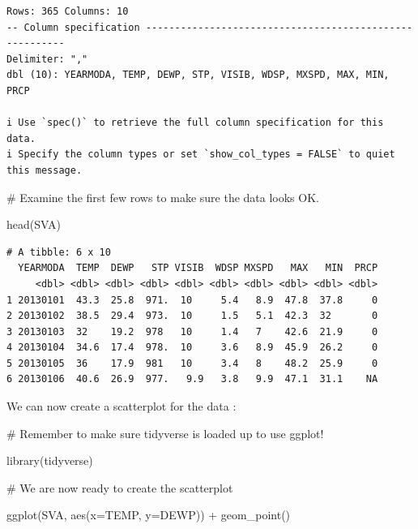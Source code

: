 \documentclass[
  letterpaper,
  DIV=11,
  numbers=noendperiod]{scrreprt}
\newenvironment{Shaded}{\begin{snugshade}}{\end{snugshade}}
\newcommand{\AttributeTok}[1]{\textcolor[rgb]{0.40,0.45,0.13}{#1}}
\newcommand{\CommentTok}[1]{\textcolor[rgb]{0.37,0.37,0.37}{#1}}
\newcommand{\FunctionTok}[1]{\textcolor[rgb]{0.28,0.35,0.67}{#1}}
\newcommand{\NormalTok}[1]{\textcolor[rgb]{0.00,0.23,0.31}{#1}}
\newcommand{\SpecialCharTok}[1]{\textcolor[rgb]{0.37,0.37,0.37}{#1}}
\begin{document}
\begin{verbatim}
Rows: 365 Columns: 10
-- Column specification --------------------------------------------------------
Delimiter: ","
dbl (10): YEARMODA, TEMP, DEWP, STP, VISIB, WDSP, MXSPD, MAX, MIN, PRCP

i Use `spec()` to retrieve the full column specification for this data.
i Specify the column types or set `show_col_types = FALSE` to quiet this message.
\end{verbatim}

\begin{Shaded}
\begin{Highlighting}[]
\CommentTok{\# Examine the first few rows to make sure the data looks OK.}

\FunctionTok{head}\NormalTok{(SVA)}
\end{Highlighting}
\end{Shaded}

\begin{verbatim}
# A tibble: 6 x 10
  YEARMODA  TEMP  DEWP   STP VISIB  WDSP MXSPD   MAX   MIN  PRCP
     <dbl> <dbl> <dbl> <dbl> <dbl> <dbl> <dbl> <dbl> <dbl> <dbl>
1 20130101  43.3  25.8  971.  10     5.4   8.9  47.8  37.8     0
2 20130102  38.5  29.4  973.  10     1.5   5.1  42.3  32       0
3 20130103  32    19.2  978   10     1.4   7    42.6  21.9     0
4 20130104  34.6  17.4  978.  10     3.6   8.9  45.9  26.2     0
5 20130105  36    17.9  981   10     3.4   8    48.2  25.9     0
6 20130106  40.6  26.9  977.   9.9   3.8   9.9  47.1  31.1    NA
\end{verbatim}

We can now create a scatterplot for the data :

\begin{Shaded}
\begin{Highlighting}[]
\CommentTok{\# Remember to make sure tidyverse is loaded up to use ggplot! }

\FunctionTok{library}\NormalTok{(tidyverse)}
\end{Highlighting}
\end{Shaded}

\begin{Shaded}
\begin{Highlighting}[]
\CommentTok{\# We are now ready to create the scatterplot}

\FunctionTok{ggplot}\NormalTok{(SVA, }\FunctionTok{aes}\NormalTok{(}\AttributeTok{x=}\NormalTok{TEMP, }\AttributeTok{y=}\NormalTok{DEWP)) }\SpecialCharTok{+}
  \FunctionTok{geom\_point}\NormalTok{()}
\end{Highlighting}
\end{Shaded}
\end{document}
